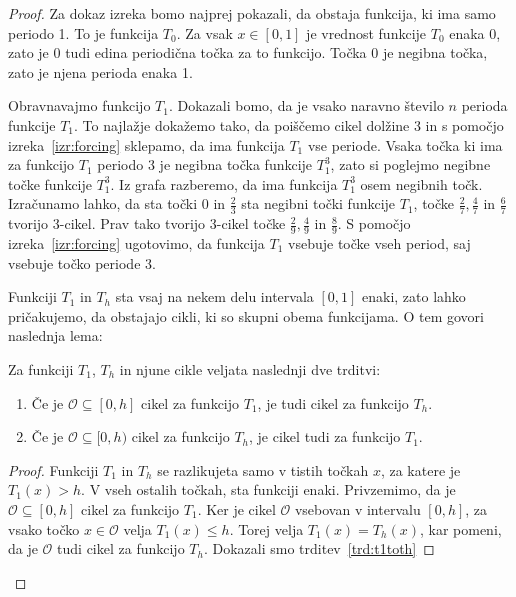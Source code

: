 \documentclass[../TG_magistrsko_delo_sections.tex]{subfiles}
\begin{document}
\begin{proof}
Za dokaz izreka bomo najprej pokazali, da obstaja funkcija, ki ima samo periodo 1. To je funkcija $T_0$. Za vsak $x \in [0, 1]$ je vrednost funkcije $T_0$ enaka 0, zato je 0 tudi edina periodična točka za to funkcijo. Točka 0 je negibna točka, zato je njena perioda enaka 1.

Obravnavajmo funkcijo $T_1$. Dokazali bomo, da je vsako naravno število $n$ perioda funkcije $T_1$. To najlažje dokažemo tako, da poiščemo cikel dolžine 3 in s pomočjo izreka~\ref{izr:forcing} sklepamo, da ima funkcija $T_1$ vse periode. Vsaka točka ki ima za funkcijo $T_1$ periodo 3 je negibna točka funkcije $T_1^3$, zato si poglejmo negibne točke funkcije $T_1^3$. Iz grafa razberemo, da ima funkcija $T_1^3$ osem negibnih točk. Izračunamo lahko, da sta točki 0 in $\frac{2}{3}$ sta negibni točki funkcije $T_1$, točke $\frac{2}{7}, \frac{4}{7}$ in $\frac{6}{7}$ tvorijo 3-cikel. Prav tako tvorijo 3-cikel točke  $\frac{2}{9}, \frac{4}{9}$ in $\frac{8}{9}$. S pomočjo izreka~\ref{izr:forcing} ugotovimo, da funkcija $T_1$ vsebuje točke vseh period, saj vsebuje točko periode 3.

Funkciji $T_1$ in $T_h$ sta vsaj na nekem delu intervala $[0, 1]$ enaki, zato lahko pričakujemo, da obstajajo cikli, ki so skupni obema funkcijama. O tem govori naslednja lema:
\begin{lema}\label{lem:t1th}
Za funkciji $T_1$, $T_h$ in njune cikle  veljata naslednji dve trditvi:
\begin{enumerate}[label={(\arabic*)}]
\item Če je $\mathcal{O} \subseteq [0, h]$ cikel za funkcijo $T_1$, je tudi cikel za funkcijo $T_h$. \label{trd:t1toth}
\item Če je $\mathcal{O} \subseteq [0, h)$ cikel za funkcijo $T_h$, je cikel tudi za funkcijo $T_1$. \label{trd:thtot1}
\end{enumerate}
\end{lema}
\begin{proof}
Funkciji $T_1$ in $T_h$ se razlikujeta samo v tistih točkah $x$, za katere je $T_1(x) > h$. V vseh ostalih točkah, sta funkciji enaki. Privzemimo, da je $\mathcal{O} \subseteq [0, h]$ cikel za funkcijo $T_1$. Ker je cikel $\mathcal{O}$ vsebovan v intervalu $[0, h]$, za vsako točko $x \in \mathcal{O}$ velja $T_1(x) \leq h$. Torej velja $T_1(x)=T_h(x)$, kar pomeni, da je $\mathcal{O}$ tudi cikel za funkcijo $T_h$. Dokazali smo trditev~\ref{trd:t1toth}


\end{proof}
\end{proof}
\end{document}
